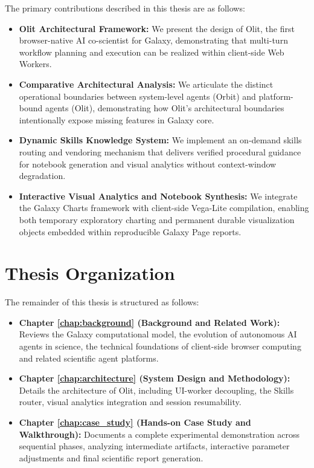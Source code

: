 The primary contributions described in this thesis are as follows:
\begin{itemize}
    \item \textbf{Olit Architectural Framework:} We present the design of Olit, the first browser-native AI co-scientist for Galaxy, demonstrating that multi-turn workflow planning and execution can be realized within client-side Web Workers.
    \item \textbf{Comparative Architectural Analysis:} We articulate the distinct operational boundaries between system-level agents (Orbit) and platform-bound agents (Olit), demonstrating how Olit's architectural boundaries intentionally expose missing features in Galaxy core.
    \item \textbf{Dynamic Skills Knowledge System:} We implement an on-demand skills routing and vendoring mechanism that delivers verified procedural guidance for notebook generation and visual analytics without context-window degradation.
    \item \textbf{Interactive Visual Analytics and Notebook Synthesis:} We integrate the Galaxy Charts framework with client-side Vega-Lite compilation, enabling both temporary exploratory charting and permanent durable visualization objects embedded within reproducible Galaxy Page reports.
\end{itemize}

\section{Thesis Organization}
\label{sec:organization}

The remainder of this thesis is structured as follows:
\begin{itemize}
    \item \textbf{Chapter \ref{chap:background} (Background and Related Work):} Reviews the Galaxy computational model, the evolution of autonomous AI agents in science, the technical foundations of client-side browser computing and related scientific agent platforms.
    \item \textbf{Chapter \ref{chap:architecture} (System Design and Methodology):} Details the architecture of Olit, including UI-worker decoupling, the Skills router, visual analytics integration and session resumability.
    \item \textbf{Chapter \ref{chap:case_study} (Hands-on Case Study and Walkthrough):} Documents a complete experimental demonstration across sequential phases, analyzing intermediate artifacts, interactive parameter adjustments and final scientific report generation.
\end{itemize}
